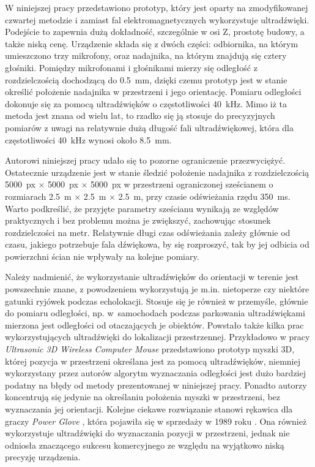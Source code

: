  W niniejszej pracy przedstawiono prototyp, który jest oparty na zmodyfikowanej czwartej metodzie i zamiast 
 fal elektromagnetycznych wykorzystuje ultradźwięki. 
 Podejście to zapewnia dużą dokładność, szczególnie w osi Z, prostotę budowy, a także niską cenę.
 Urządzenie składa się z dwóch części: odbiornika, na którym umieszczono trzy mikrofony, oraz nadajnika,
 na którym znajdują się cztery głośniki. Pomiędzy mikrofonami i głośnikami mierzy się odległość z rozdzielczością
 dochodzącą do \SI{0,5}{mm}, dzięki czemu prototyp jest w stanie określić położenie nadajnika
w przestrzeni i jego orientację. 
Pomiaru odległości dokonuje się za pomocą ultradźwięków o częstotliwości \SI{40}{kHz}.
Mimo iż ta metoda jest znana od wielu lat, to rzadko się ją stosuje do precyzyjnych pomiarów
z uwagi na relatywnie dużą długość fali ultradźwiękowej,
która dla częstotliwości \SI{40}{kHz} wynosi około \SI{8.5}{mm}.

Autorowi niniejszej pracy udało się to pozorne ograniczenie przezwyciężyć.
Ostatecznie urządzenie jest w stanie śledzić położenie nadajnika z rozdzielczością 
\SI{5000}{px} $\times$ \SI{5000}{px} $\times$ \SI{5000}{px} w przestrzeni ograniczonej sześcianem o rozmiarach 
\SI{2,5}{m} $\times$ \SI{2,5}{m}  $\times$ \SI{2,5}{m}, przy czasie odświeżania rzędu \SI{350}{ms}.
Warto podkreślić, że przyjęte parametry sześcianu wynikają ze względów praktycznych i bez 
problemu można je zwiększyć, zachowując stosunek rozdzielczości na metr.
Relatywnie długi czas odświeżania zależy głównie od czasu,  
 jakiego potrzebuje fala dźwiękowa, by się rozproszyć,
 tak by jej odbicia od powierzchni ścian nie wpływały na kolejne pomiary.

Należy nadmienić, że wykorzystanie ultradźwięków do orientacji w terenie jest powszechnie znane,
z powodzeniem wykorzystują je m.in. nietoperze czy niektóre gatunki ryjówek podczas echolokacji. Stosuje się je również 
w przemyśle, głównie do pomiaru odległości, np. w~samochodach podczas parkowania ultradźwiękami
mierzona jest odległości od otaczających je obiektów. Powstało także kilka prac wykorzystujących ultradźwięki
do lokalizacji przestrzennej. 
Przykładowo w pracy \textit{Ultrasonic 3D Wireless Computer Mouse} \cite{bib:mouse} przedstawiono prototyp myszki 3D, której
pozycja w przestrzeni określana jest za pomocą ultradźwięków, niemniej wykorzystany przez autorów algorytm wyznaczania 
odległości jest dużo bardziej podatny na błędy od metody prezentowanej w niniejszej pracy. Ponadto autorzy koncentrują się jedynie
na określaniu położenia myszki w przestrzeni, bez wyznaczania jej orientacji.
Kolejne ciekawe rozwiązanie stanowi rękawica dla graczy 
\textit{Power Glove} \cite{bib:powerGlove}, która pojawiła się w sprzedaży w 1989 roku \cite{bib:powerGlove2}. 
Ona również wykorzystuje ultradźwięki do wyznaczania pozycji
w przestrzeni, jednak nie odniosła  znaczącego sukcesu komercyjnego ze względu na wyjątkowo niską precyzję urządzenia.

